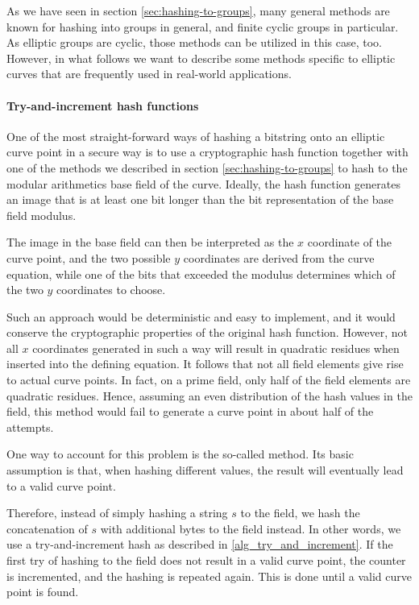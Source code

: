 As we have seen in section \ref{sec:hashing-to-groups}, many general methods are known for hashing into groups in general, and finite cyclic groups in particular. As elliptic groups are cyclic, those methods can be utilized in this case, too. However, in what follows we want to describe some methods specific to elliptic curves that are frequently used in real-world applications. 

\paragraph{Try-and-increment hash functions}
One of the most straight-forward ways of hashing a bitstring onto an elliptic curve point in a  secure way is to use a cryptographic hash function together with one of the methods we described in section \ref{sec:hashing-to-groups} to hash to the modular arithmetics base field of the curve. Ideally, the hash function generates an image that is at least one bit longer than the bit representation of the base field modulus.

The image in the base field can then be interpreted as the $x$ coordinate of the curve point, and the two possible $y$ coordinates are derived from the curve equation, while one of the bits that exceeded the modulus determines which of the two $y$ coordinates to choose.

Such an approach would be deterministic and easy to implement, and it would conserve the cryptographic properties of the original hash function. However, not all $x$ coordinates generated in such a way will result in quadratic residues when inserted into the defining equation. It follows that not all field elements give rise to actual curve points. In fact,
on a prime field, only half of the field elements are quadratic residues. Hence, assuming an even distribution of the hash values in the field, this method would fail to generate a curve point in about half of the attempts. 

One way to account for this problem is the so-called  method. Its basic assumption is that, when hashing different values, the result will eventually lead to a valid curve point. 

Therefore, instead of simply hashing a string $s$ to the field, we hash the concatenation of $s$ with additional bytes to the field instead. In other words, we use a try-and-increment hash as described in \ref{alg_try_and_increment}. If the first try of hashing to the field does not result in a valid curve point, the counter is incremented, and the hashing is repeated again. This is done until a valid curve point is found.

